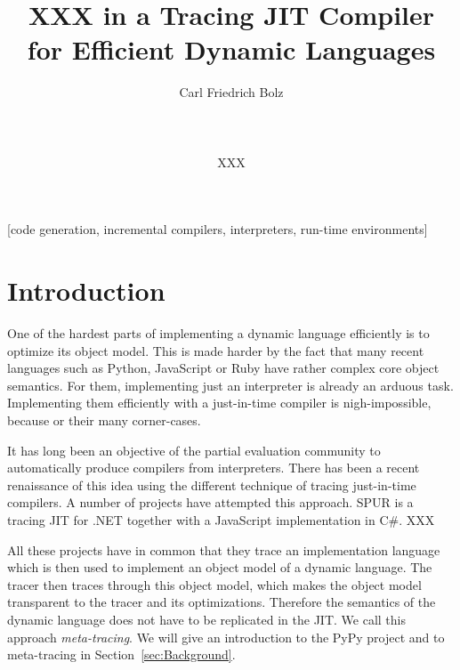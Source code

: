 \documentclass{sig-alternate}
\let\oldcite=\cite
\renewcommand\cite[1]{\ifthenelse{\equal{#1}{XXX}}{[citation~needed]}{\oldcite{#1}}}
\begin{document}
\title{XXX in a Tracing JIT Compiler for Efficient Dynamic Languages}

\author{
\alignauthor Carl Friedrich Bolz\\
       \\
       \\
       \\
\alignauthor XXX
       \\
}

\maketitle

[code generation,
incremental compilers, interpreters, run-time environments]

\begin{abstract}


\end{abstract}


\section{Introduction}

One of the hardest parts of implementing a dynamic language efficiently is to
optimize its object model. This is made harder by the fact that many recent
languages such as Python, JavaScript or Ruby have rather complex core object
semantics. For them, implementing just an interpreter is already an arduous
task. Implementing them efficiently with a just-in-time compiler is
nigh-impossible, because or their many corner-cases.

It has long been an objective of the partial evaluation community to
automatically produce compilers from interpreters. There has been a recent
renaissance of this idea using the different technique of tracing just-in-time
compilers. A number of projects have attempted this approach. SPUR \cite{XXX}
is a tracing JIT for .NET together with a JavaScript implementation in C\#. XXX

All these projects have in common that they trace an implementation language
which is then used to implement an object model of a dynamic language. The
tracer then traces through this object model, which makes the object model
transparent to the tracer and its optimizations. Therefore the semantics of the
dynamic language does not have to be replicated in the JIT. We call this
approach \emph{meta-tracing}. We will give an introduction to the PyPy project
and to meta-tracing in Section~\ref{sec:Background}.
\end{document}
